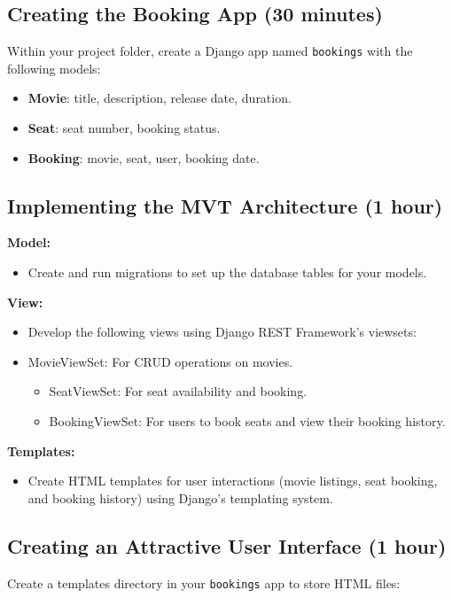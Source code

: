 \documentclass{article}
\begin{document}
\subsection{Creating the Booking App (30 minutes)}
Within your project folder, create a Django app named \texttt{bookings} with the following models:

\begin{itemize}
    \item \textbf{Movie}: title, description, release date, duration.
    \item \textbf{Seat}: seat number, booking status.
    \item \textbf{Booking}: movie, seat, user, booking date.
\end{itemize}

\subsection{Implementing the MVT Architecture (1 hour)}
\textbf{Model:}
\begin{itemize}
    \item Create and run migrations to set up the database tables for your models.
\end{itemize}
\textbf{View:}
\begin{itemize}
    \item Develop the following views using Django REST Framework's viewsets:
\end{itemize}
\begin{itemize}
        \item MovieViewSet: For CRUD operations on movies.
    \begin{itemize}
        \item SeatViewSet: For seat availability and booking.
    \end{itemize}
    \begin{itemize}
        \item BookingViewSet: For users to book seats and view their booking history.
    \end{itemize}
\end{itemize}
\textbf{Templates:}
\begin{itemize}
    \item Create HTML templates for user interactions (movie listings, seat booking, and booking history) using Django’s templating system.
\end{itemize}


\subsection{Creating an Attractive User Interface (1 hour)}
Create a templates directory in your \texttt{bookings} app to store HTML files:
\end{document}

